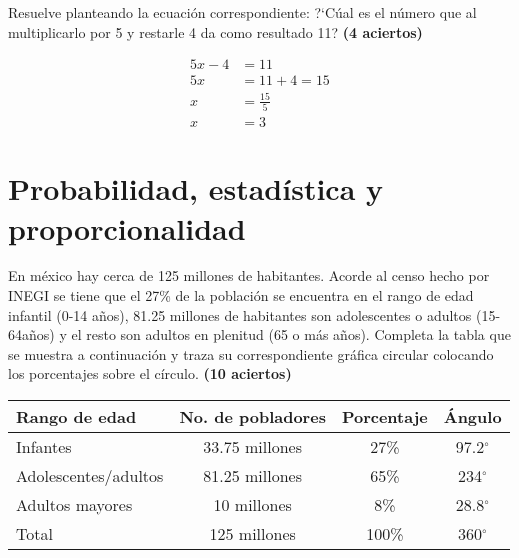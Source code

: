 \documentclass[11pt]{article}
\begin{document}
\vspace{5mm}
Resuelve planteando la ecuaci\'on correspondiente: ?`C\'ual es el n\'umero que 
al multiplicarlo por 5 y restarle 4 da como resultado 11?
\hfill \textbf{(4 aciertos)}

\begin{align*}
5x -4 &= 11 \\
5x &= 11 + 4 = 15 \\
x &= \frac{15}{5} \\ 
x &= 3
\end{align*}

\section{Probabilidad, estad\'istica y proporcionalidad}
En m\'exico hay cerca de 125 millones de habitantes. Acorde al censo hecho por
INEGI se tiene que el 27\% de la poblaci\'on se encuentra en el rango de edad
infantil (0-14 a\~nos), 81.25 millones de habitantes son adolescentes o adultos
(15-64a\~nos) y el resto son adultos en plenitud (65 o m\'as a\~nos). Completa
la tabla que se muestra a continuaci\'on y traza su correspondiente gr\'afica
circular colocando los porcentajes sobre el c\'irculo.
\hfill \textbf{(10 aciertos)}

\begin{center}
{\Large
\begin{tabular}{|l|c|c|c|}

\hline
\hline
Rango de edad & No. de pobladores & Porcentaje & \'Angulo \\
\hline
\hline
Infantes & 33.75 millones & 27\% & 97.2$^{\circ}$ \\
\hline
Adolescentes/adultos & 81.25 millones & 65\% &  234$^{\circ}$ \\
\hline
Adultos mayores & 10 millones & 8\% & 28.8$^{\circ}$ \\
\hline
\hline
Total & 125 millones & 100\% & 360$^{\circ}$ \\
\hline
\hline

\end{tabular}
}
\end{center}
\end{document}
